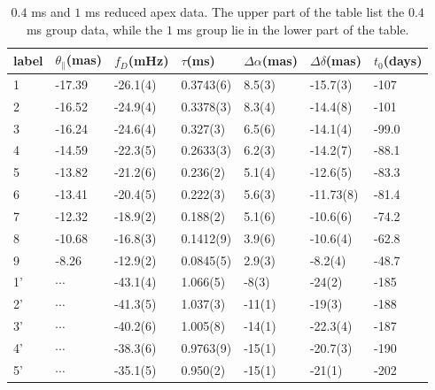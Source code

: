 \documentclass[useAMS,usenatbib]{mn2e}
\begin{document}
\begin{table}
\centering
\begin{tabular}{lllllll}
\hline
label & $\theta_{\parallel}$(mas) & $f_D$(mHz) & $\tau$(ms)  & $\Delta\alpha$(mas) & $\Delta\delta$(mas) & $t_0$(days)\\
\hline
1&-17.39   &-26.1(4)    & 0.3743(6)         & 8.5(3)    & -15.7(3)      &-107                               \\
2&-16.52  &-24.9(4)      & 0.3378(3)         & 8.3(4)  & -14.4(8)      &-101                                \\
3&-16.24   &-24.6(4)       & 0.327(3)   & 6.5(6)  & -14.1(4)       &-99.0                                \\
4&-14.59   &-22.3(5)      & 0.2633(3)    & 6.2(3)  & -14.2(7)     &-88.1                                \\
5&-13.82 &-21.2(6)        & 0.236(2)    & 5.1(4)  & -12.6(5)      &-83.3                                \\
6&-13.41 & -20.4(5)      & 0.222(3)     & 5.6(3)  & -11.73(8)    &-81.4                                \\
7&-12.32   &-18.9(2)      & 0.188(2)   & 5.1(6) & -10.6(6)      &-74.2                        \\
8&-10.68   &-16.8(3)      & 0.1412(9)  & 3.9(6) & -10.6(4)      &-62.8                                \\
9& -8.26   & -12.9(2)      & 0.0845(5) & 2.9(3)  & -8.2(4)      & -48.7                                
\\ \hline
1'&$ \cdots$ & -43.1(4)      & 1.066(5)    & -8(3)     & -24(2)   &-185   \\
2'&$\cdots$ & -41.3(5)    & 1.037(3)   & -11(1)     & -19(3)   &-188                                   \\
3'&$\cdots$ & -40.2(6)  & 1.005(8)    & -14(1)       & -22.3(4)  &-187                                   \\
4'&$\cdots$ & -38.3(6)  & 0.9763(9)   & -15(1)       & -20.7(3)  &-190                                    \\
5'&$\cdots$&         -35.1(5)  & 0.950(2)   & -15(1)  & -21(1)   &-202                                   \\
 \hline                                 
\end{tabular}
\caption{ $0.4$ ms and $1$ ms reduced apex data. 
The upper part of the table list the $0.4$ ms group data, while the $1$ ms group lie in the lower part of the table. 
}
\end{table}
\end{document}
